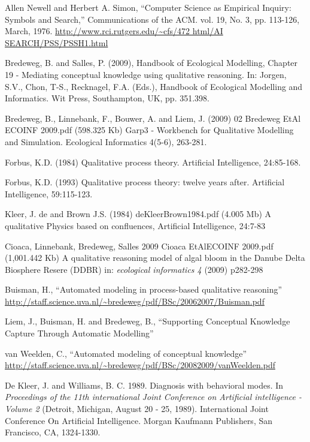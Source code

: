 \documentclass{article} %
\begin{document}
\begin{thebibliography}{99}

 Allen Newell and Herbert A. Simon, ``Computer Science as
Empirical Inquiry: Symbols and Search,'' Communications of the ACM. vol. 19,
No. 3, pp. 113-126, March, 1976. \url{http://www.rci.rutgers.edu/~cfs/472
html/AI SEARCH/PSS/PSSH1.html}

 Bredeweg, B. and Salles, P. (2009), Handbook of
Ecological Modelling, Chapter 19 - Mediating conceptual knowledge using
qualitative reasoning. In: J\/orgen, S.V., Chon, T-S., Recknagel, F.A. (Eds.),
Handbook of Ecological Modelling and Informatics. Wit Press, Southampton, UK,
pp. 351.398.

 Bredeweg, B., Linnebank, F., Bouwer, A. and Liem, J.
(2009) 02 Bredeweg EtAl ECOINF 2009.pdf (598.325 Kb) Garp3 - Workbench for
Qualitative Modelling and Simulation. Ecological Informatics 4(5-6), 263-281.

 Forbus, K.D. (1984) Qualitative process theory. Artificial 
Intelligence, 24:85-168. 

 Forbus, K.D. (1993) Qualitative process theory: twelve years
after. Artificial Intelligence, 59:115-123. 

 Kleer, J. de and Brown J.S. (1984) deKleerBrown1984.pdf (4.005
Mb) A qualitative Physics based on confluences, Artificial Intelligence,
24:7-83 %

 Cioaca, Linnebank, Bredeweg, Salles 2009 Cioaca EtAlECOINF
2009.pdf (1,001.442 Kb) A qualitative reasoning model of algal bloom in the
Danube Delta Biosphere Resere (DDBR) in: \emph{ecological informatics 4} (2009)
p282-298

 Buisman, H., ``Automated modeling in process-based
qualitative reasoning''
\url{http://staff.science.uva.nl/~bredeweg/pdf/BSc/20062007/Buisman.pdf}

 Liem, J., Buisman, H. and Bredeweg, B., ``Supporting
Conceptual Knowledge Capture Through Automatic Modelling''

 van Weelden, C., ``Automated modeling of conceptual
knowledge'' \url{http://staff.science.uva.nl/~bredeweg/pdf/BSc/20082009/vanWeelden.pdf}

	De Kleer, J. and Williams, B. C. 1989. Diagnosis with behavioral modes.
	In \emph{Proceedings of the 11th international Joint Conference on Artificial
	intelligence - Volume 2} (Detroit, Michigan, August 20 - 25, 1989).
	International Joint Conference On Artificial Intelligence. Morgan
	Kaufmann Publishers, San Francisco, CA, 1324-1330. 

\end{thebibliography}
\end{document}
